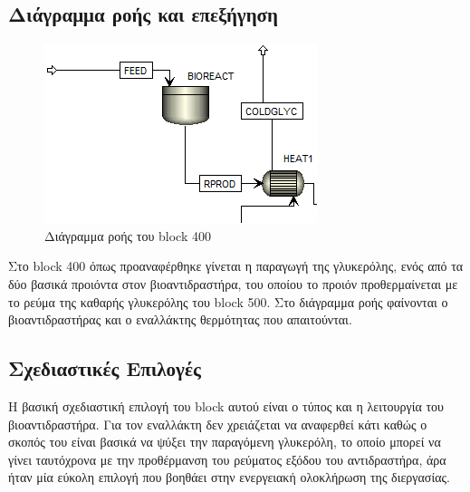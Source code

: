 \documentclass[11pt]{article}
\begin{document}
\subsection{Διάγραμμα ροής και επεξήγηση}
\label{sec:org6addd15}
\begin{figure}[htbp]
\centering
\includegraphics[width=.9\linewidth]{Διάγραμμα_ροής_και_Επεξήγηση/2023-01-12_16-53-41_screenshot.png}
\caption{Διάγραμμα ροής του block 400}
\end{figure}

Στο block 400 όπως προαναφέρθηκε γίνεται η παραγωγή της γλυκερόλης, ενός από τα δύο βασικά προιόντα στον βιοαντιδραστήρα, του οποίου το προιόν προθερμαίνεται με το ρεύμα της καθαρής γλυκερόλης του block 500. Στο διάγραμμα ροής φαίνονται ο βιοαντιδραστήρας και ο εναλλάκτης θερμότητας που απαιτούνται.

\subsection{Σχεδιαστικές Επιλογές}
\label{sec:orgbdcdfcf}
Η βασική σχεδιαστική επιλογή του block αυτού είναι ο τύπος και η λειτουργία του βιοαντιδραστήρα. Για τον εναλλάκτη δεν χρειάζεται να αναφερθεί κάτι καθώς ο σκοπός του είναι βασικά να ψύξει την παραγόμενη γλυκερόλη, το οποίο μπορεί να γίνει ταυτόχρονα με την προθέρμανση του ρεύματος εξόδου του αντιδραστήρα, άρα ήταν μία εύκολη επιλογή που βοηθάει στην ενεργειακή ολοκλήρωση της διεργασίας.
\end{document}
